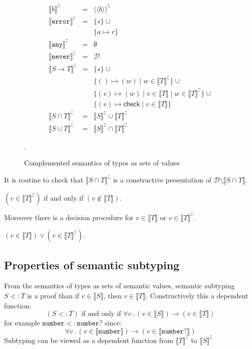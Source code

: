 \documentclass[acmsmall,review,screen]{acmart}
\newcommand{\NEVER}{\mathtt{never}}
\newcommand{\ANY}{\mathtt{any}}
\newcommand{\ERROR}{\mathtt{error}}
\newcommand{\NUMBER}{\mathtt{number}}
\newcommand{\CHECK}{\mathsf{check}}
\newcommand{\fun}{\mathbin{\rightarrow}}
\newcommand{\sem}[1]{\llbracket{#1}\rrbracket}
\newcommand{\ssem}[1]{\langle\!\langle{#1}\rangle\!\rangle}
\newcommand{\nsem}[1]{\llbracket{#1}\rrbracket^\complement}
\newcommand{\nssem}[1]{\ssem{#1}^\complement}
\newcommand{\st}{\mathbin.}
\begin{document}
\begin{figure}

\[\begin{array}{rcl}
  \nsem{b} & = & \nssem{b} \\
  \nsem{\ERROR} & = & \{ s \} \cup {} \\
              && \{ a \mapsto r \} \\
  \nsem{\ANY} & = & \emptyset \\
  \nsem{\NEVER} & = & \mathcal{D} \\
  \nsem{S \fun T} & = & \{ s \} \cup {} \\
              && \{ () \mapsto (w) \mid w \in \nsem{T} \} \cup {} \\
              && \{ (v) \mapsto (w) \mid v \in \sem{T} \mid w \in \nsem{T} \} \cup {} \\
              && \{ (v) \mapsto \CHECK \mid v \in \sem{T} \} \\
  \nsem{S \cap T} & = & \nsem{S} \cup \nsem{T} \\
  \nsem{S \cup T} & = & \nsem{S} \cap \nsem{T}
\end{array}\]
\caption{Complemented semantics of types as sets of values}
\label{fig:typnsem}.

\end{figure}

It is routine to check that $\nsem{S \cap T}$ is a constructive
presentation of $\mathcal{D} \setminus \sem{S \cap T}$.

\begin{lemma}
  \label{lem:language-comp}
  $(v \in \nsem{T})$ if and only if $(v \not\in \sem{T})$.
\end{lemma}

Moreover there is a decision procedure for $v \in \sem{T}$ or $v \in \nsem{T}$.

\begin{lemma}
  \label{lem:language-dec}
  $(v \in \sem{T}) \lor (v \in \nsem{T})$.
\end{lemma}

\subsection{Properties of semantic subtyping}

From the semantics of types as sets of semantic values,
semantic subtyping $S <: T$ is a proof than if $v \in \sem{S}$, then
$v \in \sem{T}$. Constructively this a dependent function:
\[
  (S <: T) \mbox{ if and only if } \forall v \st (v \in \sem{S}) \fun (v \in \sem{T})
\]
for example $\NUMBER <: \NUMBER?$ since:
\[
  \forall v \st (v \in \sem{\NUMBER}) \fun (v \in \sem{\NUMBER?})
\]
Subtyping can be viewed as a dependent function from $\nsem{T}$ to $\nsem{S}$
\end{document}
